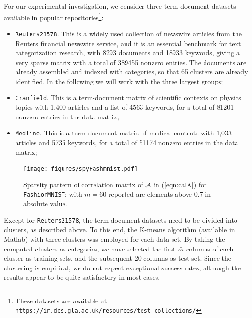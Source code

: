 \documentclass{siamart190516}
\begin{document}
\vskip 0.1in

 For our experimental investigation, we consider three term-document datasets available in popular repositories\footnote{These datasets
are available at {\tt https://ir.dcs.gla.ac.uk/resources/test\_collections/}}:

\vskip 0.1in
\begin{itemize}
\item {\tt Reuters21578}. This 
is a widely used collection of newswire articles
from the Reuters financial newswire service, and it is an essential benchmark for text categorization research, with 8293 documents and 18933 keywords, giving a very sparse matrix with a total of 389455 nonzero entries. The documents are already assembled and indexed with categories, so that 65
clusters are already identified. In the following
we will work with the three
largest groups;

\item {\tt Cranfield}. This is a term-document matrix of scientific contexts on physics topics with 1,400 articles
and a list of 4563 keywords, for a total of 81201 nonzero entries in the data matrix;

\item {\tt Medline}. This is a term-document matrix  of medical contents with 1,033  articles
 and 5735 keywords, for a total of 51174 nonzero entries in
the data matrix;

\end{itemize}
\vskip 0.1in 

\begin{figure}[hbt]
\centering
\texttt{[image: figures/spyFashmnist.pdf]} \,
   \caption{Sparsity pattern of correlation matrix of
   ${\cal A}$ in (\ref{eqn:calA})
   for {\tt FashionMNIST}; with $m=60$  reported are elements above 0.7 in absolute value.\label{fig:spydata1}}
\end{figure}

Except for {\tt Reuters21578}, the term-document
datasets need to be divided into clusters, as described above.
To this end, the K-means algorithm (available in Matlab) with three clusters was
employed  for each data set.  By taking the
computed clusters as categories, we have selected the first
$\bar m$ columns of each cluster as training sets, and
the subsequent 20 columns as test set.  Since the clustering is
empirical, we do not expect exceptional success rates,
although the results appear to be quite satisfactory in most cases.
\end{document}
